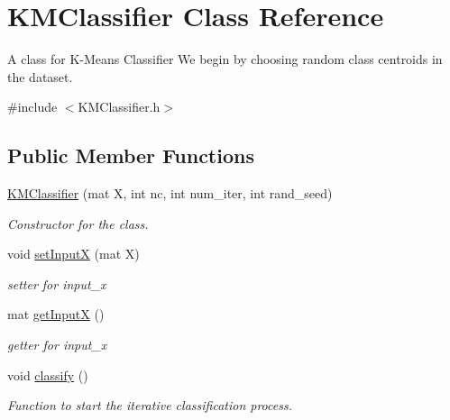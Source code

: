 \hypertarget{classKMClassifier}{}\section{K\+M\+Classifier Class Reference}
\label{classKMClassifier}


A class for K-\/\+Means Classifier We begin by choosing random class centroids in the dataset.  




{\ttfamily \#include $<$K\+M\+Classifier.\+h$>$}

\subsection*{Public Member Functions}
\begin{DoxyCompactItemize}
\item 
\hyperlink{classKMClassifier_a5dbb59060646ab3dd794cc2f24c5d6c5}{K\+M\+Classifier} (mat X, int nc, int num\+\_\+iter, int rand\+\_\+seed)
\begin{DoxyCompactList}\small\item\em Constructor for the class. \end{DoxyCompactList}\item 
\mbox{\label{classKMClassifier_add340f75c2f172817dd697416df7a951}} 
void \hyperlink{classKMClassifier_add340f75c2f172817dd697416df7a951}{set\+InputX} (mat X)
\begin{DoxyCompactList}\small\item\em setter for input\+\_\+x \end{DoxyCompactList}\item 
\mbox{\label{classKMClassifier_a6f8ec04c99bc74ce41ed5773190626e6}} 
mat \hyperlink{classKMClassifier_a6f8ec04c99bc74ce41ed5773190626e6}{get\+InputX} ()
\begin{DoxyCompactList}\small\item\em getter for input\+\_\+x \end{DoxyCompactList}\item 
\mbox{\label{classKMClassifier_a7e240d4fe5cb68b6271b9ec4eba6520f}} 
void \hyperlink{classKMClassifier_a7e240d4fe5cb68b6271b9ec4eba6520f}{classify} ()
\begin{DoxyCompactList}\small\item\em Function to start the iterative classification process. \end{DoxyCompactList}\end{DoxyCompactItemize}
